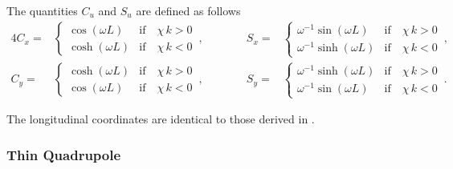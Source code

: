 The quantities $C_u$ and $S_u$ are defined as follows
\begin{alignat}{4}
C_x = &\begin{cases}  \cos \left( \omega L \right)  & \text{if} \quad  \chi \, k>0 \\ 
\cosh \left( \omega L \right)  & \text{if} \quad  \chi \, k<0 \end{cases} \, , \quad \quad \quad&S_x = &\begin{cases}  \omega^{-1}  \sin \left( \omega L \right)  & \text{if} \quad  \chi \, k>0 \\ \omega^{-1}\sinh \left( \omega L \right)  & \text{if} \quad  \chi \, k<0 \end{cases} \label{eq:quad_solution1}
\, , \\ 
C_y = &\begin{cases}  \cosh \left( \omega L \right)  & \text{if} \quad  \chi \, k>0 \\ 
\cos \left( \omega L \right)  & \text{if} \quad  \chi \, k<0 \end{cases} \, ,\quad \quad \quad&S_y = &\begin{cases}  \omega^{-1}  \sinh \left( \omega L \right)  & \text{if} \quad  \chi \, k>0 \\ \omega^{-1}\sin \left( \omega L \right)   & \text{if} \quad  \chi \, k<0 \end{cases} \label{eq:quad_solution2}
\, . 
\end{alignat}

The longitudinal coordinates are identical to those derived in \cite{SixTrackLibManual}.


\subsubsection{Thin Quadrupole}

